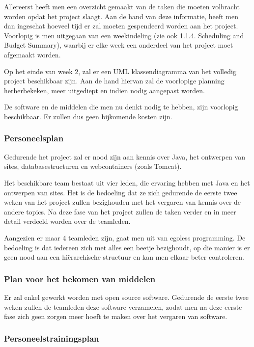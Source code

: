 \documentclass{article}
\begin{document}
Allereerst heeft men een overzicht gemaakt van de taken die moeten volbracht worden opdat het project slaagt. Aan de hand van deze informatie, heeft men dan ingeschat hoeveel tijd er zal moeten gespendeerd worden aan het project. Voorlopig is men uitgegaan van een weekindeling (zie ook  1.1.4. Scheduling and Budget Summary), waarbij er elke week een onderdeel van het project moet afgemaakt worden. 

Op het einde van week 2, zal er een UML klassendiagramma van het volledig project beschikbaar zijn. Aan de hand hiervan zal de voorlopige planning herherbekeken, meer uitgediept en indien nodig aangepast worden.

De software en de middelen die men nu denkt nodig te hebben, zijn voorlopig beschikbaar. Er zullen dus geen bijkomende kosten zijn.

\subsubsection{Personeelsplan}

Gedurende het project zal er nood zijn aan kennis over Java, het ontwerpen van sites, databasestructuren en  webcontainers (zoals Tomcat). 

Het beschikbare team bestaat uit vier leden, die ervaring hebben met Java en het ontwerpen van sites. Het is de bedoeling dat ze zich gedurende de eerste twee weken van het project zullen bezighouden met het vergaren van kennis over de andere topics. Na deze fase van het project zullen de taken verder en in meer detail verdeeld worden over de teamleden.

Aangezien er maar 4 teamleden zijn, gaat men uit van egoless programming. De bedoeling is dat iedereen zich met alles een beetje bezighoudt, op die manier is er geen nood aan een hi\"{e}rarchische structuur en kan men elkaar beter controleren. 

\subsubsection{Plan voor het bekomen van middelen}

Er zal enkel gewerkt worden met open source software. Gedurende de eerste twee weken zullen de teamleden deze software verzamelen, zodat men na deze eerste fase zich geen zorgen meer hoeft te maken over het vergaren van software. 

\subsubsection{Personeelstrainingsplan}
\end{document}
